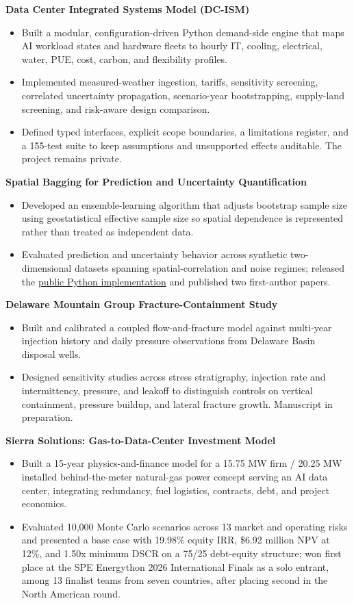 \documentclass[10pt,letterpaper]{article}
\newcommand{\cvproject}[2]{%
  \needspace{3\baselineskip}%
  {\bfseries #1}\hspace{0.35em}{\color{muted}#2}\par
  \vspace{0.5pt}%
}
\newenvironment{cvitems}{%
  \begin{itemize}[leftmargin=13pt,label=\textbullet,itemsep=1.2pt,topsep=1pt,parsep=0pt,partopsep=0pt]
}{\end{itemize}\vspace{1.5pt}}
\begin{document}
\cvproject{Data Center Integrated Systems Model (DC-ISM)}{2025-2026}
\begin{cvitems}
  \item Built a modular, configuration-driven Python demand-side engine that maps AI workload states and hardware fleets to hourly IT, cooling, electrical, water, PUE, cost, carbon, and flexibility profiles.
  \item Implemented measured-weather ingestion, tariffs, sensitivity screening, correlated uncertainty propagation, scenario-year bootstrapping, supply-land screening, and risk-aware design comparison.
  \item Defined typed interfaces, explicit scope boundaries, a limitations register, and a 155-test suite to keep assumptions and unsupported effects auditable. The project remains private.
\end{cvitems}

\cvproject{Spatial Bagging for Prediction and Uncertainty Quantification}{2022-2025}
\begin{cvitems}
  \item Developed an ensemble-learning algorithm that adjusts bootstrap sample size using geostatistical effective sample size so spatial dependence is represented rather than treated as independent data.
  \item Evaluated prediction and uncertainty behavior across synthetic two-dimensional datasets spanning spatial-correlation and noise regimes; released the \href{https://github.com/fozba/spatialbootstrap}{public Python implementation} and published two first-author papers.
\end{cvitems}

\cvproject{Delaware Mountain Group Fracture-Containment Study}{2024-Present}
\begin{cvitems}
  \item Built and calibrated a coupled flow-and-fracture model against multi-year injection history and daily pressure observations from Delaware Basin disposal wells.
  \item Designed sensitivity studies across stress stratigraphy, injection rate and intermittency, pressure, and leakoff to distinguish controls on vertical containment, pressure buildup, and lateral fracture growth. Manuscript in preparation.
\end{cvitems}

\cvproject{Sierra Solutions: Gas-to-Data-Center Investment Model}{2026}
\begin{cvitems}
  \item Built a 15-year physics-and-finance model for a 15.75 MW firm / 20.25 MW installed behind-the-meter natural-gas power concept serving an AI data center, integrating redundancy, fuel logistics, contracts, debt, and project economics.
  \item Evaluated 10,000 Monte Carlo scenarios across 13 market and operating risks and presented a base case with 19.98\% equity IRR, \$6.92 million NPV at 12\%, and 1.50x minimum DSCR on a 75/25 debt-equity structure; won first place at the SPE Energython 2026 International Finals as a solo entrant, among 13 finalist teams from seven countries, after placing second in the North American round.
\end{cvitems}
\end{document}
